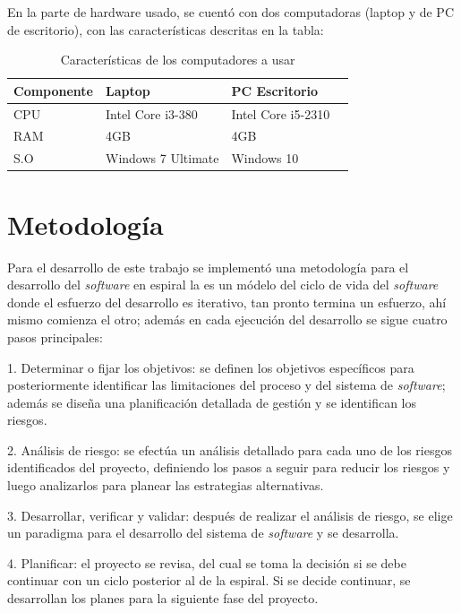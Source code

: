 En la parte de hardware usado, se cuent\'o con dos computadoras (laptop y de PC de escritorio), con las caracter\'isticas descritas en la tabla:

\begin{table}[H]
\begin{center}
\begin{tabular}{|l|l|l|l|}
\hline
Componente & Laptop & PC Escritorio \\ \hline
CPU & Intel Core i3-380 & Intel Core i5-2310 \\ \hline
RAM & 4GB & 4GB \\ \hline
S.O & Windows 7 Ultimate & Windows 10  \\ \hline

\end{tabular}
\caption{Caracter\'isticas de los computadores a usar}
\label{tabla:componente}
\end{center}
\end{table}

\section{Metodolog\'ia}

Para el desarrollo de este trabajo se implement\'o  una metodolog\'ia para el desarrollo del \textit{software} en espiral  la es un m\'odelo del ciclo de vida del \textit{software} donde el esfuerzo del desarrollo es iterativo, tan pronto termina un esfuerzo, ah\'i mismo comienza el otro; adem\'as en cada ejecuci\'on del desarrollo se sigue cuatro pasos principales:

1. Determinar o fijar los objetivos: se definen los objetivos espec\'ificos para posteriormente identificar las limitaciones del proceso y del sistema de \textit{software}; adem\'as se dise\~na una planificaci\'on detallada de gesti\'on y se identifican los riesgos.

2. An\'alisis de riesgo: se efect\'ua un an\'alisis detallado para cada uno de los riesgos identificados del proyecto, definiendo los pasos a seguir para reducir los riesgos y luego analizarlos para planear las estrategias alternativas.

3. Desarrollar, verificar y validar: despu\'es de realizar el an\'alisis de riesgo, se elige un paradigma para el desarrollo del sistema de \textit{software} y se desarrolla.

4. Planificar: el proyecto se revisa, del cual se toma la decisi\'on si se debe continuar con un ciclo posterior al de la espiral. Si se decide continuar, se desarrollan los planes para la siguiente fase del proyecto. \citet{spiral}

